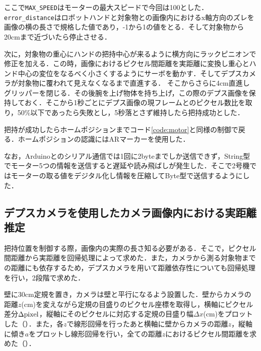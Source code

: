 ここで\texttt{MAX\_SPEED}はモーターの最大スピードで今回は100とした．\texttt{error\_distance}はロボットハンドと対象物との画像内におけるx軸方向のズレを画像の横の長さで規格した値であり，-1から1の値をとる．そして対象物から20cmまで近づいたら停止させる．

次に，対象物の重心にハンドの把持中心が来るように横方向にラックピニオンで修正を加える．この時，画像におけるピクセル間距離を実距離に変換し重心とハンド中心の変位をなるべく小さくするようにサーボを動かす．そしてデプスカメラが対象物に覆われて見えなくなるまで直進する．
そこからさらに4cm直進しグリッパーを閉じる．その後腕を上げ物体を持ち上げ，この際のデプス画像を保持しておく．そこから1秒ごとにデプス画像の現フレームとのピクセル数比を取り，50\%以下であったら失敗とし，5秒落とさず維持したら把持成功とした．

把持が成功したらホームポジションまでコード\ref{code:motor}と同様の制御で戻る．ホームポジションの認識にはARマーカーを使用した．

なお，Arduinoとのシリアル通信では1回に2byteまでしか送信できず，String型でモーター5つの情報を送信すると遅延や読み飛ばしが発生した．そこで2号機ではモーターの取る値をデジタル化し情報を圧縮してByte型で送信するようにした．


\subsection{デプスカメラを使用したカメラ画像内における実距離推定}
把持位置を制御する際，画像内の実際の長さ知る必要がある．そこで，ピクセル間距離から実距離を回帰処理によって求めた．また，カメラから測る対象物までの距離にも依存するため，デプスカメラを用いて距離依存性についても回帰処理を行い，2段階で求めた．

壁に30cm定規を置き，カメラは壁と平行になるよう設置した．壁からカメラの距離$z$(cm)を変えながら定規の目盛りのピクセル座標を取得し，横軸にピクセル差分$\Delta \rm{pixel}$，縦軸にそのピクセルに対応する定規の目盛り幅$\Delta x$(cm)をプロットした（）．また，各$z$で線形回帰を行ったあと横軸に壁からカメラの距離$z$，縦軸に傾き$a$をプロットし線形回帰を行い，全ての距離$z$におけるピクセル間距離を求めた（）．


